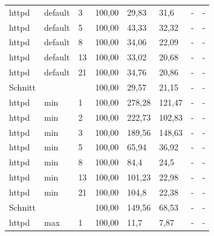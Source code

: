 \begin{footnotesize}
\begin{longtable}{llllllll}
		httpd          & default & 3          & 100,00 & 29,83                       & 31,6                           & -      & -      \\
		httpd          & default & 5          & 100,00 & 43,33                       & 32,32                          & -      & -      \\
		httpd          & default & 8          & 100,00 & 34,06                       & 22,09                          & -      & -      \\
		httpd          & default & 13         & 100,00 & 33,02                       & 20,68                          & -      & -      \\
		httpd          & default & 21         & 100,00 & 34,76                       & 20,86                          & -      & -      \\ \hline
		Schnitt        &         &            & 100,00 & 29,57                       & 21,15                          & -      & -      \\ \hline
		httpd          & min     & 1          & 100,00 & 278,28                      & 121,47                         & -      & -      \\
		httpd          & min     & 2          & 100,00 & 222,73                      & 102,83                         & -      & -      \\
		httpd          & min     & 3          & 100,00 & 189,56                      & 148,63                         & -      & -      \\
		httpd          & min     & 5          & 100,00 & 65,94                       & 36,92                          & -      & -      \\
		httpd          & min     & 8          & 100,00 & 84,4                        & 24,5                           & -      & -      \\
		httpd          & min     & 13         & 100,00 & 101,23                      & 22,98                          & -      & -      \\
		httpd          & min     & 21         & 100,00 & 104,8                       & 22,38                          & -      & -      \\ \hline
		Schnitt        &         &            & 100,00 & 149,56                      & 68,53                          & -      & -      \\ \hline
		httpd          & max     & 1          & 100,00 & 11,7                        & 7,87                           & -      & -      \\

\end{longtable}
\end{footnotesize}
